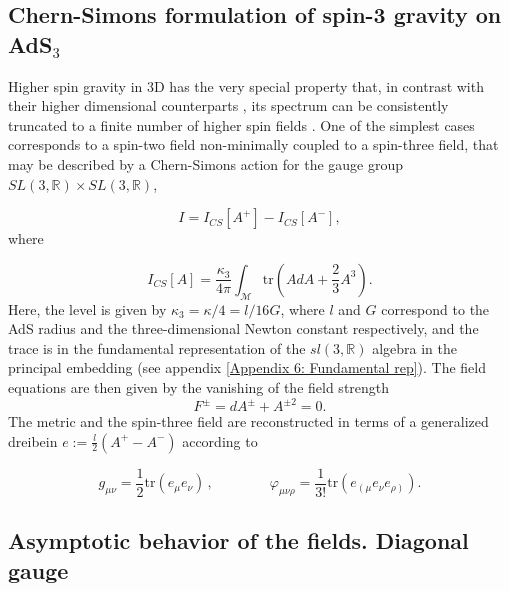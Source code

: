 \documentclass[letterpaper,11pt,oneside]{book}
\begin{document}
\subsection{Chern-Simons formulation of spin-3 gravity on AdS$_{3}$}

Higher spin gravity in 3D has the very special property that, in contrast
with their higher dimensional counterparts \cite{Fradkin:1987ks,Vasiliev:1990en,Vasiliev:2003ev},
its spectrum can be consistently truncated to a finite number of higher
spin fields \cite{Blencowe:1988gj,Bergshoeff:1989ns,Henneaux:2010xg,Campoleoni:2010zq}.
One of the simplest cases corresponds to a spin-two field non-minimally
coupled to a spin-three field, that may be described by a Chern-Simons
action for the gauge group $SL\left(3,\mathbb{R}\right)\times SL\left(3,\mathbb{R}\right)$,

\begin{equation}
	I=I_{CS}\left[A^{+}\right]-I_{CS}\left[A^{-}\right],\label{eq:ICS}
\end{equation}
where

\begin{equation}
	I_{CS}[A]=\frac{\kappa_{3}}{4\pi}\int_{\mathcal{M}}\text{tr}\left(AdA+\frac{2}{3}A^{3}\right).\label{eq:Chern-Simons Action}
\end{equation}
Here, the level is given by \emph{$\kappa_{3}=\kappa/4=l/16G$}, where
$l$ and $G$ correspond to the AdS radius and the three-dimensional
Newton constant respectively, and the trace is in the fundamental
representation of the $sl\left(3,\mathbb{R}\right)$ algebra in the
principal embedding (see appendix \ref{Appendix 6: Fundamental rep}).
The field equations are then given by the vanishing of the field strength
\begin{equation}
	F^{\pm}=dA^{\pm}+A^{\pm2}=0.\label{eq:Field Strength}
\end{equation}
The metric and the spin-three field are reconstructed in terms of
a generalized dreibein $e:=\frac{l}{2}\left(A^{+}-A^{-}\right)$ according
to

\[
g_{\mu\nu}=\frac{1}{2}\textrm{tr}\left(e_{\mu}e_{\nu}\right)\,,\qquad\qquad\varphi_{\mu\nu\rho}=\frac{1}{3!}\textrm{tr}\left(e_{\left(\mu\right.}e_{\nu}e_{\left.\rho\right)}\right).
\]


\subsection{Asymptotic behavior of the fields. Diagonal gauge\label{subsec:2.1 Asymptotic behavior of the fields. Diagonal gauge}}
\end{document}

